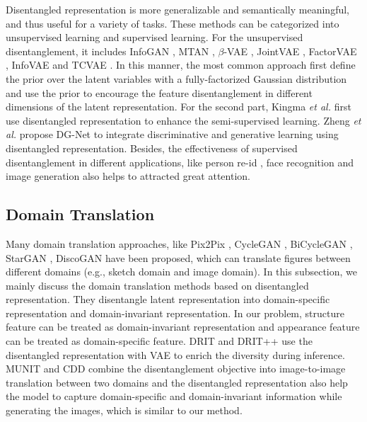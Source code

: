 \documentclass[10pt,twocolumn,letterpaper]{article}
\begin{document}
Disentangled representation is more generalizable and semantically meaningful, and thus useful for a variety of tasks.
These methods can be categorized into unsupervised learning and supervised learning.
For the unsupervised disentanglement, it includes InfoGAN \cite{chen2016infogan}, MTAN \cite{liu2018multi}, $\beta$-VAE \cite{higgins2017beta}, JointVAE \cite{dupont2018learning}, FactorVAE \cite{kim2018disentangling}, InfoVAE \cite{zhao2017infovae} and TCVAE \cite{chen2018isolating}. 
In this manner, the most common approach first define the prior over the latent variables with a fully-factorized Gaussian distribution and use the prior to encourage the feature disentanglement in different dimensions of the latent representation.
For the second part, Kingma \textit{et al.}  \cite{kingma2014semi} first use disentangled representation to enhance the semi-supervised learning. Zheng \textit{et al.} \cite{zheng2019joint} propose DG-Net to integrate discriminative and generative learning using disentangled representation. Besides, the effectiveness of supervised disentanglement in different applications, like person re-id \cite{zheng2019joint}, face recognition \cite{liu2018unified, liu2018exploring, shu2017neural, tran2017disentangled} and image generation \cite{ma2018disentangled, yan2016attribute2image, mathieu2016disentangling, jha2018disentangling} also helps to attracted great attention.

\subsection{Domain Translation}
Many domain translation approaches, like Pix2Pix \cite{pix2pix2017}, CycleGAN \cite{zhu2017unpaired}, BiCycleGAN \cite{zhu2017toward}, StarGAN \cite{StarGAN2018}, DiscoGAN \cite{kim2017learning} have been proposed, which can translate figures between different domains (e.g., sketch domain and image domain).
In this subsection, we mainly discuss the domain translation methods based on disentangled representation. 
They disentangle latent representation into domain-specific representation and domain-invariant representation. 
In our problem, structure feature can be treated as domain-invariant representation and appearance feature can be treated as domain-specific feature.
DRIT \cite{lee2018diverse} and DRIT++ \cite{lee2019drit} use the disentangled representation with VAE to enrich the diversity during inference. MUNIT \cite{huang2018multimodal} and CDD \cite{gonzalez2018image} combine the disentanglement objective into image-to-image translation between two domains \color{red} and the disentangled representation also help the model to capture domain-specific and domain-invariant information while generating the images, which is similar to our method. \color{black}
\end{document}
